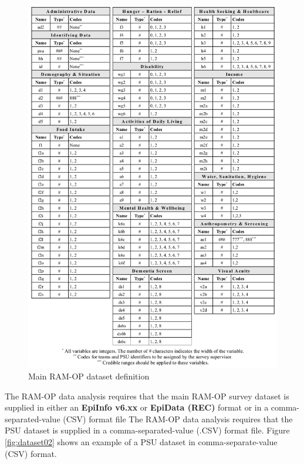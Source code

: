 \documentclass[12pt,a4paper]{book}
\theoremstyle{definition}
\theoremstyle{definition}
\theoremstyle{definition}
\theoremstyle{remark}
\begin{document}
\begin{figure}[H]

{\centering \includegraphics{figures/dataset01} 

}

\caption{Main RAM-OP dataset definition}\label{fig:dataset01}
\end{figure}

The RAM-OP data analysis requires that the main RAM-OP survey dataset is
supplied in either an \textbf{EpiInfo v6.xx} or \textbf{EpiData (REC)}
format or in a comma-separated-value (CSV) format file The RAM-OP data
analysis requires that the PSU dataset is supplied in a
comma-separated-value (.CSV) format file. Figure \ref{fig:dataset02}
shows an example of a PSU dataset in comma-separate-value (CSV) format.
\end{document}
